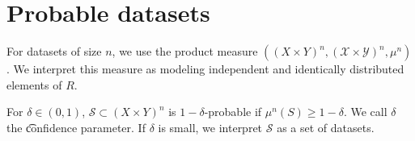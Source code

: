 \section*{Probable datasets}

For datasets of size $n$, we use the product measure $((X \times  Y)^n, (\mathcal{X}  \times  \mathcal{Y} )^n, \mu ^n)$.
We interpret this measure as modeling independent and identically distributed elements of $R$.

For $\delta  \in (0, 1)$, $\mathcal{S}  \subset (X \times Y)^n$ is \t{$1 - \delta $-probable} if $\mu ^n(S) \geq 1 - \delta $.
We call $\delta $ the \t{confidence parameter}.
If $\delta $ is small, we interpret $\mathcal{S} $ as a set of  datasets.
